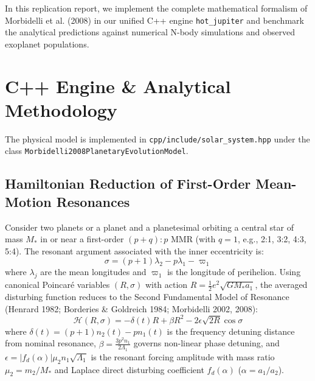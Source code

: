 \documentclass[11pt,a4paper]{article}
\begin{document}
In this replication report, we implement the complete mathematical formalism of Morbidelli et al. (2008) in our unified C++ engine \texttt{hot\_jupiter} and benchmark the analytical predictions against numerical N-body simulations and observed exoplanet populations.

\section{C++ Engine \& Analytical Methodology}
The physical model is implemented in \texttt{cpp/include/solar\_system.hpp} under the class \texttt{Morbidelli2008}\-\texttt{PlanetaryEvolutionModel}.

\subsection{Hamiltonian Reduction of First-Order Mean-Motion Resonances}
Consider two planets or a planet and a planetesimal orbiting a central star of mass $M_*$ in or near a first-order $(p+q):p$ MMR (with $q = 1$, e.g., 2:1, 3:2, 4:3, 5:4). The resonant argument associated with the inner eccentricity is:
\begin{equation}
\sigma = (p+1)\lambda_2 - p\lambda_1 - \varpi_1
\label{eq:sigma_def}
\end{equation}
where $\lambda_j$ are the mean longitudes and $\varpi_1$ is the longitude of perihelion. Using canonical Poincaré variables $(R, \sigma)$ with action $R = \frac{1}{2} e^2 \sqrt{G M_* a_1}$, the averaged disturbing function reduces to the Second Fundamental Model of Resonance (Henrard 1982; Borderies \& Goldreich 1984; Morbidelli 2002, 2008):
\begin{equation}
\mathcal{H}(R, \sigma) = -\delta(t) R + \beta R^2 - 2\epsilon \sqrt{2R} \cos\sigma
\label{eq:hamiltonian}
\end{equation}
where $\delta(t) = (p+1) n_2(t) - p n_1(t)$ is the frequency detuning distance from nominal resonance, $\beta = \frac{3 p^2 n_1}{2 \Lambda_1}$ governs non-linear phase detuning, and $\epsilon = |f_d(\alpha)| \mu_2 n_1 \sqrt{\Lambda_1}$ is the resonant forcing amplitude with mass ratio $\mu_2 = m_2/M_*$ and Laplace direct disturbing coefficient $f_d(\alpha)$ ($\alpha = a_1/a_2$).
\end{document}
